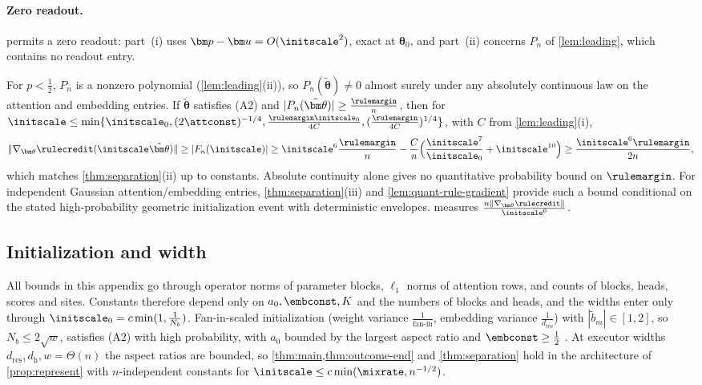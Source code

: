 \paragraph{Zero readout.}\label{rem:zero-readout}  permits a zero readout: part~(i) uses $\bm p-\bm u=O(\initscale^2)$, exact at $\bm\theta_0$, and part~(ii) concerns $P_n$ of
\cref{lem:leading}, which contains no readout entry.


\begin{remark}
\label{rem:generic-rule}
For $p<\frac{1}{2}$, $P_n$ is a nonzero polynomial (\cref{lem:leading}(ii)), so $P_n(\tilde{\bm\theta})\ne0$ almost surely under any absolutely continuous law on
the attention and embedding entries. If $\tilde{\bm\theta}$ satisfies (A2) and $|P_n(\tilde{\bm\theta})|\ge\frac{\rulemargin}{n}$, then for
$\initscale\le\min\{\initscale_0,(2\attconst)^{-1/4},\frac{\rulemargin\initscale_0}{4C},(\frac{\rulemargin}{4C})^{1/4}\}$, with $C$ from \cref{lem:leading}(i),
\[
 \|\nabla_{\bm\theta}\rulecredit(\initscale\tilde{\bm\theta})\|\ge|F_n(\initscale)|\ge\initscale^6\frac{\rulemargin}{n}-\frac{C}{n}\Bigl(\frac{\initscale^7}{\initscale_0}+\initscale^{10}\Bigr)\ge\frac{\initscale^6\rulemargin}{2n},
\]
which matches \cref{thm:separation}(ii) up to constants. Absolute continuity alone
gives no quantitative probability bound on $\rulemargin$. For independent Gaussian
attention/embedding entries, \cref{thm:separation}(iii) and
\cref{lem:quant-rule-gradient} provide such a bound conditional on the stated
high-probability geometric initialization event with deterministic envelopes.  measures $\frac{n\|\nabla_{\bm\theta}\rulecredit\|}{\initscale^6}$.
\end{remark}

\subsection{Initialization and width}
\label{rem:end-width}
All bounds in this appendix go through operator norms of parameter blocks, $\ell_1$ norms of attention rows, and counts of blocks,
heads, scores and sites. Constants therefore depend only on $a_0,\embconst,K$ and the numbers of blocks and heads, and the widths enter only
through $\initscale_0=c\min(1,\frac{1}{N_b})$. Fan-in-scaled initialization (weight variance $\frac{1}{\text{fan-in}}$, embedding variance $\frac{1}{d_{\mathrm{res}}}$) with
$|\tilde b_m|\in[1,2]$, so $N_b\le2\sqrt w$, satisfies (A2) with high probability, with $a_0$ bounded by the largest aspect ratio and $\embconst\ge\frac{1}{2}$
\citep[Thms.~4.4.5, 4.6.1]{vershynin2018high}. At executor widths $d_{\mathrm{res}},d_{\mathrm h},w=\Theta(n)$ the aspect ratios are bounded, so
\cref{thm:main,thm:outcome-end} and \cref{thm:separation} hold in the architecture of \cref{prop:represent} with $n$-independent constants for
$\initscale\le c\min(\mixrate,n^{-1/2})$.


